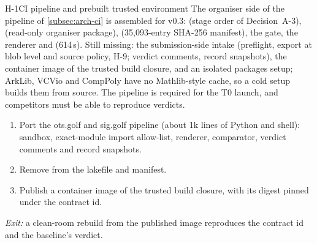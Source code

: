 \begin{issue}{H-1}{CI pipeline and prebuilt trusted environment}
\IRprob The organiser side of the pipeline of \cref{subsec:arch-ci} is assembled for v0.3:
 (stage order of Decision~A-3),  (read-only organiser package),
 (35,093-entry SHA-256 manifest), the gate, the renderer and 
(614\,s). Still missing: the submission-side intake (preflight, export at blob level and source
policy, H-9; verdict comments, record snapshots), the container image of the trusted build closure, and an isolated
packages setup; ArkLib, VCVio and CompPoly have no Mathlib-style cache, so a cold setup builds them
from source.
\IRwhy The pipeline is required for the T0 launch, and competitors must be able to reproduce
verdicts.
\IRres
\begin{enumerate}[nosep,leftmargin=1.4em]
\item Port the ots.golf and sig.golf pipeline (about 1k lines of Python and shell): sandbox,
  exact-module import allow-list, renderer, comparator, verdict comments and record snapshots.
\item Remove  from the lakefile and manifest.
\item Publish a container image of the trusted build closure, with its digest pinned under the
  contract id.
\end{enumerate}
\emph{Exit:} a clean-room rebuild from the published image reproduces the contract id and the
baseline's verdict.
\end{issue}

